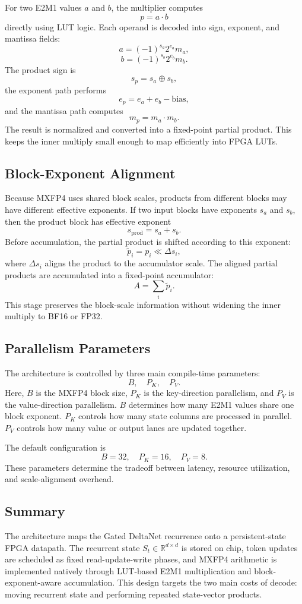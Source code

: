 \documentclass[conference]{IEEEtran}
\begin{document}
For two E2M1 values $a$ and $b$, the multiplier computes
\[
p = a \cdot b
\]
directly using LUT logic. Each operand is decoded into sign, exponent, and
mantissa fields:
\[
a = (-1)^{s_a} 2^{e_a} m_a,
\]
\[
b = (-1)^{s_b} 2^{e_b} m_b.
\]
The product sign is
\[
s_p = s_a \oplus s_b,
\]
the exponent path performs
\[
e_p = e_a + e_b - \text{bias},
\]
and the mantissa path computes
\[
m_p = m_a \cdot m_b.
\]
The result is normalized and converted into a fixed-point partial product. This
keeps the inner multiply small enough to map efficiently into FPGA LUTs.

\subsection{Block-Exponent Alignment}

Because MXFP4 uses shared block scales, products from different blocks may have
different effective exponents. If two input blocks have exponents $s_a$ and
$s_b$, then the product block has effective exponent
\[
s_{\text{prod}} = s_a + s_b.
\]
Before accumulation, the partial product is shifted according to this exponent:
\[
\tilde{p}_i = p_i \ll \Delta s_i,
\]
where $\Delta s_i$ aligns the product to the accumulator scale. The aligned
partial products are accumulated into a fixed-point accumulator:
\[
A = \sum_i \tilde{p}_i.
\]
This stage preserves the block-scale information without widening the inner
multiply to BF16 or FP32.

\subsection{Parallelism Parameters}

The architecture is controlled by three main compile-time parameters:
\[
B,\quad P_K,\quad P_V.
\]
Here, $B$ is the MXFP4 block size, $P_K$ is the key-direction parallelism, and
$P_V$ is the value-direction parallelism. $B$ determines how many E2M1 values
share one block exponent. $P_K$ controls how many state columns are processed in
parallel. $P_V$ controls how many value or output lanes are updated together.

The default configuration is
\[
B = 32,\quad P_K = 16,\quad P_V = 8.
\]
These parameters determine the tradeoff between latency, resource utilization,
and scale-alignment overhead.

\subsection{Summary}

The architecture maps the Gated DeltaNet recurrence onto a persistent-state FPGA
datapath. The recurrent state $S_t \in \mathbb{R}^{d \times d}$ is stored on
chip, token updates are scheduled as fixed read-update-write phases, and MXFP4
arithmetic is implemented natively through LUT-based E2M1 multiplication and
block-exponent-aware accumulation. This design targets the two main costs of
decode: moving recurrent state and performing repeated state-vector products.
\end{document}
